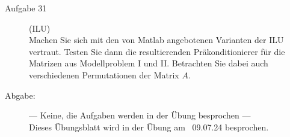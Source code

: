 \documentclass[a4paper,11pt]{scrartcl}
\begin{document}
\begin{description}
\item[Aufgabe 31] (ILU) \\
Machen Sie sich mit den von Matlab angebotenen Varianten der ILU vertraut. Testen Sie dann die resultierenden Präkonditionierer für die Matrizen aus Modellproblem I und II. Betrachten Sie dabei auch verschiedenen Permutationen der Matrix $A$.
\end{description}


\begin{description}
\item[Abgabe:] --- Keine, die Aufgaben werden in der Übung besprochen ---\\
Dieses Übungsblatt wird in der Übung am ~09.07.24 besprochen.



\end{description}
\end{document}
